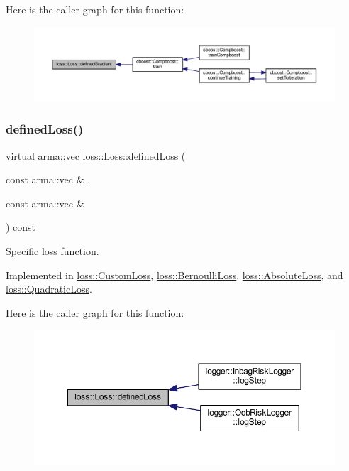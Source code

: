 Here is the caller graph for this function\+:
\nopagebreak
\begin{figure}[H]
\begin{center}
\leavevmode
\includegraphics[width=350pt]{classloss_1_1_loss_a267a4de70747ade4b2d84ce35a448979_icgraph}
\end{center}
\end{figure}
\mbox{\label{classloss_1_1_loss_ae9f94dd9b8311397583ba3a9cb485e94}} 
\subsubsection{\texorpdfstring{defined\+Loss()}{definedLoss()}}
{\footnotesize\ttfamily virtual arma\+::vec loss\+::\+Loss\+::defined\+Loss (\begin{DoxyParamCaption}\item[{const arma\+::vec \&}]{,  }\item[{const arma\+::vec \&}]{ }\end{DoxyParamCaption}) const\hspace{0.3cm}{\ttfamily [pure virtual]}}



Specific loss function. 



Implemented in \mbox{\hyperlink{classloss_1_1_custom_loss_a2a96bc5e4b4894bbaa64745a3f7c0fd5}{loss\+::\+Custom\+Loss}}, \mbox{\hyperlink{classloss_1_1_bernoulli_loss_a1e347cacc5a5925874f579834f421236}{loss\+::\+Bernoulli\+Loss}}, \mbox{\hyperlink{classloss_1_1_absolute_loss_acfef6f0de3cfcccebd4bbfc04133cf1e}{loss\+::\+Absolute\+Loss}}, and \mbox{\hyperlink{classloss_1_1_quadratic_loss_ae34f68243ffe021e309ed73a68796e1e}{loss\+::\+Quadratic\+Loss}}.

Here is the caller graph for this function\+:
\nopagebreak
\begin{figure}[H]
\begin{center}
\leavevmode
\includegraphics[width=350pt]{classloss_1_1_loss_ae9f94dd9b8311397583ba3a9cb485e94_icgraph}
\end{center}
\end{figure}


